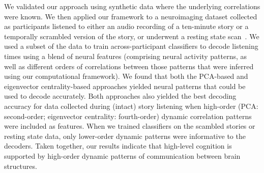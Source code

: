 \documentclass[english]{article}
\begin{document}
We validated our approach using synthetic data where the underlying
correlations were known.  We then applied our framework to a
neuroimaging dataset collected as participants
listened to either an audio recording of a ten-minute story or a
temporally scrambled version of the story, or underwent a resting
state scan~\citep{SimoEtal16}.  We used a subset of the data to train
across-participant classifiers to decode listening times using a blend
of neural features (comprising neural activity patterns, as well as
different orders of correlations between those patterns that were
inferred using our computational framework).  We found that both the
PCA-based and eigenvector centrality-based approaches yielded neural
patterns that could be used to decode accurately.  Both approaches
also yielded the best decoding accuracy for data collected during
(intact) story listening when high-order (PCA: second-order;
eigenvector centrality: fourth-order) dynamic correlation patterns
were included as features.  When we trained classifiers on the
scambled stories or resting state data, only lower-order dynamic
patterns were informative to the decoders.  Taken together, our
results indicate that high-level cognition is supported by high-order
dynamic patterns of communication between brain structures.
\end{document}
